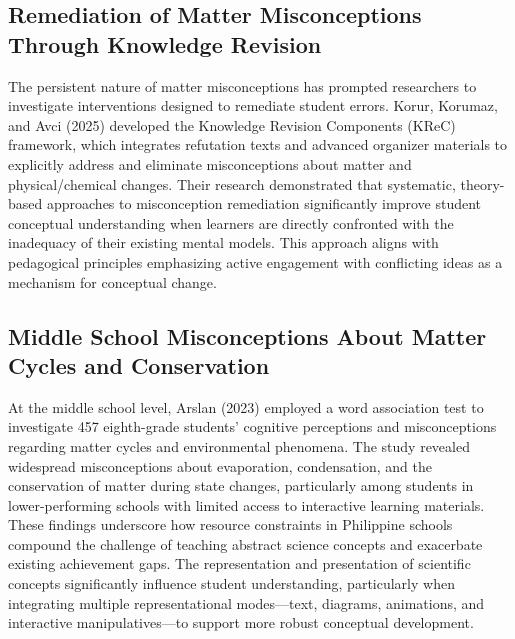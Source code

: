 \subsection{Remediation of Matter Misconceptions Through Knowledge Revision}

The persistent nature of matter misconceptions has prompted researchers to investigate interventions designed to remediate student errors. Korur, Korumaz, and Avci (2025) developed the Knowledge Revision Components (KReC) framework, which integrates refutation texts and advanced organizer materials to explicitly address and eliminate misconceptions about matter and physical/chemical changes. Their research demonstrated that systematic, theory-based approaches to misconception remediation significantly improve student conceptual understanding when learners are directly confronted with the inadequacy of their existing mental models. This approach aligns with pedagogical principles emphasizing active engagement with conflicting ideas as a mechanism for conceptual change.

\subsection{Middle School Misconceptions About Matter Cycles and Conservation}

At the middle school level, Arslan (2023) employed a word association test to investigate 457 eighth-grade students' cognitive perceptions and misconceptions regarding matter cycles and environmental phenomena. The study revealed widespread misconceptions about evaporation, condensation, and the conservation of matter during state changes, particularly among students in lower-performing schools with limited access to interactive learning materials. These findings underscore how resource constraints in Philippine schools compound the challenge of teaching abstract science concepts and exacerbate existing achievement gaps. The representation and presentation of scientific concepts significantly influence student understanding, particularly when integrating multiple representational modes---text, diagrams, animations, and interactive manipulatives---to support more robust conceptual development.

